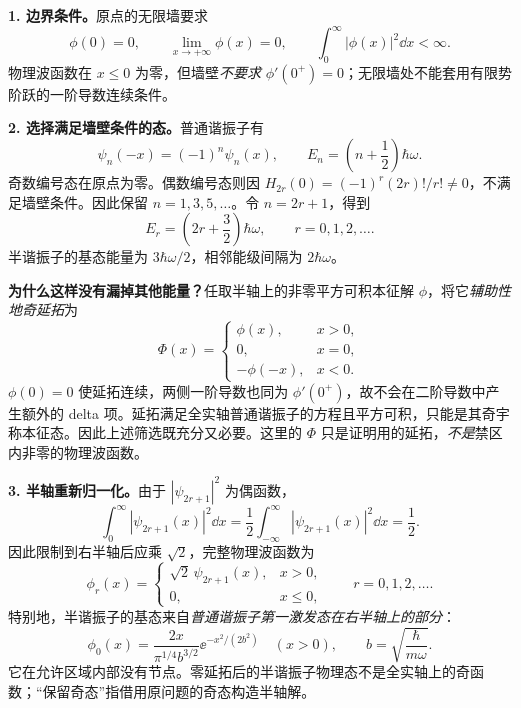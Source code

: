 \begin{checkedsolution}
\textbf{1. 边界条件。}原点的无限墙要求
\begin{equation}
  \boxed{\phi(0)=0},\qquad
  \lim_{x\to+\infty}\phi(x)=0,\qquad
  \int_0^\infty|\phi(x)|^2\dd x<\infty.
\end{equation}
物理波函数在 $x\le0$ 为零，但墙壁\emph{不要求} $\phi'(0^+)=0$；无限墙处不能套用有限势阶跃的一阶导数连续条件。

\textbf{2. 选择满足墙壁条件的态。}普通谐振子有
\begin{equation}
  \psi_n(-x)=(-1)^n\psi_n(x),\qquad
  E_n=\left(n+\frac12\right)\hbar\omega.
\end{equation}
奇数编号态在原点为零。偶数编号态则因
$H_{2r}(0)=(-1)^r(2r)!/r!\ne0$，不满足墙壁条件。因此保留
$n=1,3,5,\ldots$。令 $n=2r+1$，得到
\begin{equation}
  \boxed{E_r=\left(2r+\frac32\right)\hbar\omega},
  \qquad r=0,1,2,\ldots.
\end{equation}
半谐振子的基态能量为 $3\hbar\omega/2$，相邻能级间隔为 $2\hbar\omega$。

\textbf{为什么这样没有漏掉其他能量？}任取半轴上的非零平方可积本征解 $\phi$，将它\emph{辅助性地奇延拓}为
\begin{equation}
  \Phi(x)=\begin{cases}\phi(x),&x>0,\\
             0,&x=0,\\-\phi(-x),&x<0.
          \end{cases}
\end{equation}
$\phi(0)=0$ 使延拓连续，两侧一阶导数也同为 $\phi'(0^+)$，故不会在二阶导数中产生额外的 delta 项。延拓满足全实轴普通谐振子的方程且平方可积，只能是其奇宇称本征态。因此上述筛选既充分又必要。这里的 $\Phi$ 只是证明用的延拓，\emph{不是}禁区内非零的物理波函数。

\textbf{3. 半轴重新归一化。}由于 $|\psi_{2r+1}|^2$ 为偶函数，
\begin{equation}
  \int_0^\infty|\psi_{2r+1}(x)|^2\dd x
    =\frac12\int_{-\infty}^{\infty}|\psi_{2r+1}(x)|^2\dd x
    =\frac12.
\end{equation}
因此限制到右半轴后应乘 $\sqrt2$，完整物理波函数为
\begin{equation}
  \boxed{\phi_r(x)=\begin{cases}
      \sqrt2\,\psi_{2r+1}(x),&x>0,\\
      0,&x\le0,
    \end{cases}}
  \qquad r=0,1,2,\ldots.
\end{equation}
特别地，半谐振子的基态来自\emph{普通谐振子第一激发态在右半轴上的部分}：
\begin{equation}
  \phi_0(x)=\frac{2x}{\pi^{1/4}b^{3/2}}\ee^{-x^2/(2b^2)}
  \quad(x>0),\qquad b=\sqrt{\frac{\hbar}{m\omega}}.
\end{equation}
它在允许区域内部没有节点。零延拓后的半谐振子物理态不是全实轴上的奇函数；“保留奇态”指借用原问题的奇态构造半轴解。
\end{checkedsolution}

